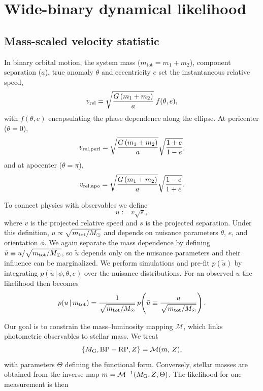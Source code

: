 \section{Wide-binary dynamical likelihood}
\label{sec:dynamics}

\subsection{Mass-scaled velocity statistic}

In binary orbital motion, the system mass ($m_{\mathrm{tot}} = m_1+m_2$), component separation ($a$), true anomaly $\theta$ and eccentricity $e$ set the instantaneous relative speed,
\begin{equation}
    v_{\rm rel} = \sqrt{\frac{G\,(m_1+m_2)}{a}}\; f(\theta,e),
\end{equation}
with $f(\theta,e)$ encapsulating the phase dependence along the ellipse. At pericenter ($\theta=0$),
\begin{equation}
    v_{\rm rel,peri} = \sqrt{\frac{G\,(m_1+m_2)}{a}} \sqrt{\frac{1+e}{1-e}},
\end{equation}
and at apocenter ($\theta=\pi$),
\begin{equation}
    v_{\rm rel,apo} = \sqrt{\frac{G\,(m_1+m_2)}{a}} \sqrt{\frac{1-e}{1+e}}.
\end{equation}

To connect physics with observables we define
\begin{equation}
    u := v \sqrt{s},
\end{equation}
where $v$ is the projected relative speed and $s$ is the projected separation. Under this definition, $u \propto \sqrt{m_{\rm tot}/M_{\odot}}$ and depends on nuisance parameters $\theta$, $e$, and orientation $\phi$. We again separate the mass dependence by defining $\tilde{u} \equiv u/\sqrt{m_{\rm tot}/M_{\odot}}$, so $\tilde{u}$ depends only on the nuisance parameters and their influence can be marginalized. We perform simulations and pre-fit $p(\tilde{u})$ by integrating $p(\tilde{u}\,|\,\phi,\theta,e)$ over the nuisance distributions. For an observed $u$ the likelihood then becomes
\begin{equation}
    p(u\,|\,m_{\rm tot}) = \frac{1}{\sqrt{m_{\rm tot}/M_{\odot}}}\,p\!\left(\tilde{u} \equiv \frac{u}{\sqrt{m_{\rm tot}/M_{\odot}}}\right).
\end{equation}

Our goal is to constrain the mass--luminosity mapping $\mathcal{M}$, which links photometric observables to stellar mass. We treat
\begin{equation}
    \{M_{\rm G}, {\rm BP-RP}, Z\} = \mathcal{M}(m,\,Z),
\end{equation}
with parameters $\Theta$ defining the functional form.  Conversely, stellar
masses are obtained from the inverse map
$m=\mathcal{M}^{-1}(M_{\rm G},Z;\Theta)$. The likelihood for one measurement is then

